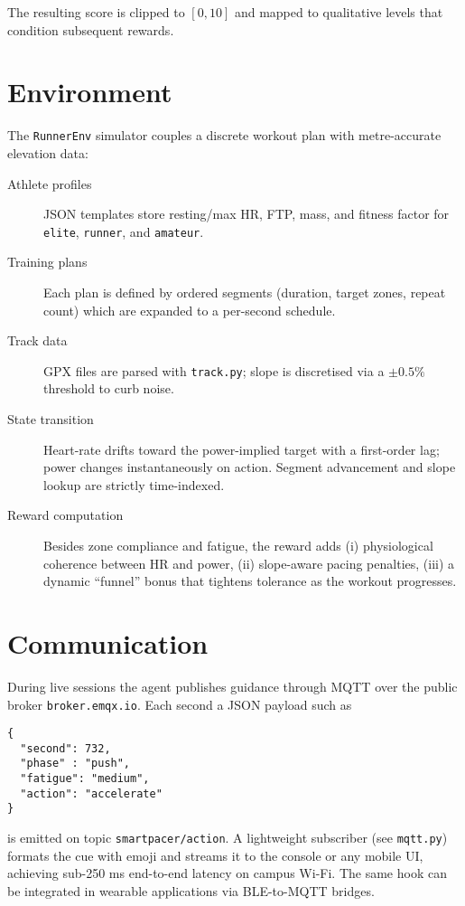 \documentclass[a4paper,12pt]{article}
\begin{document}
The resulting score is clipped to $[0,10]$ and mapped to qualitative levels that condition subsequent rewards.

\section{Environment}
The \texttt{RunnerEnv} simulator couples a discrete workout plan with metre-accurate elevation data:

\begin{description}
  \item[Athlete profiles] JSON templates store resting/max HR, FTP, mass, and fitness factor for \texttt{elite}, \texttt{runner}, and \texttt{amateur}.
  \item[Training plans] Each plan is defined by ordered segments (duration, target zones, repeat count) which are expanded to a per-second schedule.
  \item[Track data] GPX files are parsed with \texttt{track.py}; slope is discretised via a $\pm0.5\%$ threshold to curb noise.
  \item[State transition] Heart-rate drifts toward the power-implied target with a first-order lag; power changes instantaneously on action.  Segment advancement and slope lookup are strictly time-indexed.
  \item[Reward computation] Besides zone compliance and fatigue, the reward adds (i) physiological coherence between HR and power, (ii) slope-aware pacing penalties, (iii) a dynamic “funnel” bonus that tightens tolerance as the workout progresses.
\end{description}

\section{Communication}
During live sessions the agent publishes guidance through MQTT over the public broker \texttt{broker.emqx.io}.  
Each second a JSON payload such as

\begin{verbatim}
{
  "second": 732,
  "phase" : "push",
  "fatigue": "medium",
  "action": "accelerate"
}
\end{verbatim}

is emitted on topic \texttt{smartpacer/action}.  
A lightweight subscriber (see \texttt{mqtt.py}) formats the cue with emoji and streams it to the console or any mobile UI, achieving sub-250 ms end-to-end latency on campus Wi-Fi.  
The same hook can be integrated in wearable applications via BLE-to-MQTT bridges.
\end{document}
